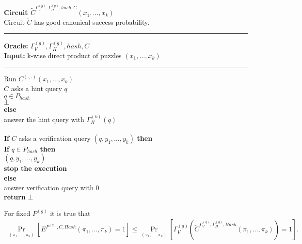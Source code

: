 \begin{codeblock}
  \textbf{Circuit $\widetilde{C}^{\Gamma_V^{(g)}, \Gamma_H^{(g)}, hash, C} (x_1, \dots, x_k)$} \\
  Circuit $\widetilde{C}$ has good canonical success probability.
  \medskip

  \hrule

  \medskip

  \textbf{Oracle:} $\Gamma_V^{(g)}, \Gamma_H^{(g)}, hash, C$ \\
  \textbf{Input:} k-wise direct product of puzzles $(x_1, \dots, x_k)$

  \medskip\hrule\medskip
  Run $C^{(\cdot,\cdot)}(x_1, \dots, x_k)$ \\
  \IndI \If $C$ asks a hint query $q$ \then\\
  \IndII \If $q \in P_{hash}$ \then\\
  \IndIII \return $\bot$\\
  \IndII \textbf{else}\\
  \IndIII answer the hint query with $\Gamma_H^{(k)}(q)$\\
  \\
  \IndI \textbf{If} $C$ asks a verification query $(q, y_1, \dots, y_k)$ \textbf{then} \\
  \IndII \textbf{If} $q \in P_{hash}$ \textbf{then} \\
  \IndIII {} $(q, y_1, \dots, y_k)$ \\
  \IndIII \textbf{stop the execution} \\
  \IndII \textbf{else} \\
  \IndIII answer verification query with 0 \\
  \textbf{return} $\bot$
\end{codeblock}

\begin{lemma}
  For fixed $P^{(g)}$ it is true that
  \begin{align*}
  \underset{(\pi_1, \dots, \pi_k)}{\Pr}[E^{P^{(g)}, C, Hash}(\pi_1, \dots, \pi_k) = 1] \leq \underset{(\pi_1, \dots, \pi_k)}{\Pr}[\Gamma_V^{(g)} (\widetilde{C}^{\Gamma_V^{(g)}, \Gamma_H^{(g)}, Hash}(\pi_1, \dots, \pi_k)) = 1].
  \end{align*}
\end{lemma}

